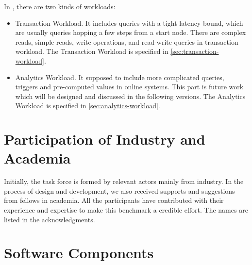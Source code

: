 In \ldbcfinbench, there are two kinds of workloads:
\begin{itemize}
    \item Transaction Workload. It includes queries with a tight latency bound, which are usually
          queries hopping a few steps from a start node. There are complex reads, simple reads, write
          operations, and read-write queries in transaction workload. The Transaction Workload is specified
          in \autoref{sec:transaction-workload}.
    \item Analytics Workload. It supposed to include more complicated queries, \eg triggers and pre-computed
              values in online systems. This part is future work which will be designed and discussed in the
          following versions. The Analytics Workload is specified in \autoref{sec:analytics-workload}.
\end{itemize}


\section{Participation of Industry and Academia}

Initially, the \ldbcfinbench task force is formed by relevant actors mainly from
industry. In the process of design and development, we also received supports and
suggestions from fellows in academia. All the participants have contributed with
their experience and expertise to make this benchmark a credible effort. The names
are listed in the acknowledgments.


\section{Software Components}

